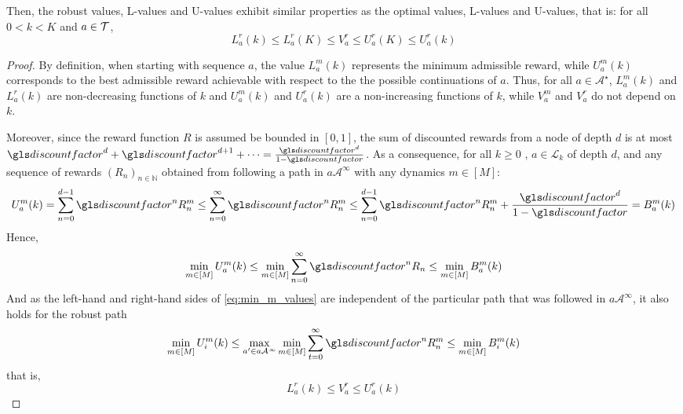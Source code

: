 \begin{subappendices}
\begin{lemma}
\begin{leftbar}[lemmabar]
		Then, the robust values, L-values and U-values exhibit similar properties as the optimal values, L-values and U-values, that is: for all $0 < k < K$ and $a\in\mathcal{T}$,
		\begin{equation}
		L^r_a(k) \leq L^r_a(K) \leq V^r_a \leq U^r_a(K) \leq U^r_a(k)
		\end{equation}
		\end{leftbar}
	\end{lemma}
	\begin{proof}
		By definition, when starting with sequence $a$, the value $L_a^m(k)$ represents the minimum admissible reward, while $U_a^m(k)$ corresponds to the best admissible reward achievable with respect to the the possible continuations of $a$. Thus, for all $a\in\mathcal{A}^{\star}$, $L_a^m(k)$ and $L_a^r(k)$ are non-decreasing functions of $k$ and $U_a^m(k)$ and $U_a^r(k)$ are a non-increasing functions of $k$, while $V_a^m$ and $V_a^r$ do not depend on $k$.
		
		Moreover, since the reward function $R$ is assumed be bounded in $[0, 1]$, the sum of discounted rewards from a node of depth $d$ is at most $\discount^d + \discount^{d+1}+\dots = \frac{\discount^d}{1-\discount}$. As a consequence, for all $k \geq 0$ , $a\in\mathcal{L}_k$ of depth $d$, and any sequence of rewards $(R_n)_{n\in\mathbb{N}}$ obtained from following a path in $a\mathcal{A}^\infty$ with any dynamics $m \in [M]$:
		\begin{equation*}
		U^m_a(k) = \sum_{n=0}^{d-1} \discount^n R_n^m \leq \sum_{n=0}^\infty \discount^n R_n^m \leq \sum_{n=0}^{d-1} \discount^n R_n^m + \frac{\discount^d}{1-\discount} = B^m_a(k) 
		\end{equation*}
		Hence,
		\begin{equation}
		\label{eq:min_m_values}
		\min_{m \in [M]} U^m_a(k) \leq \min_{m \in [M]} \sum_{n=0}^\infty \discount^n R_n \leq \min_{m \in [M]} B^m_a(k)
		\end{equation}
		And as the left-hand and right-hand sides of \eqref{eq:min_m_values} are independent of the particular path that was followed in $a\mathcal{A}^\infty$, it also holds for the robust path
		\begin{equation*}
		\min_{m \in [M]} U^m_i(k) \leq \max_{a'\in a\mathcal{A}^\infty} \min_{m \in [M]} \sum_{t=0}^\infty \discount^n R_n^m \leq \min_{m \in [M]} B^m_i(k)
		\end{equation*}
		that is,
		\begin{equation}
		\label{eq:urvrbr}
		L^r_a(k) \leq V^r_a  \leq U^r_a(k)
		\end{equation}
		

\end{proof}
\end{subappendices}
